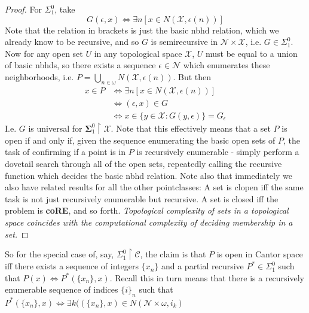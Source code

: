 \documentclass{article}
\theoremstyle{definition}
\theoremstyle{plain}
\begin{document}
\begin{proof}
	For $\Sigma_1^0$, take 
	\[ G(\epsilon,x) \iff \exists n[x \in N(\mathcal{X},\epsilon(n))] \]
	Note that the relation in brackets is just the basic nbhd relation, which we already know to be recursive, and so $G$ is semirecursive in $\mathcal{N} \times \mathcal{X}$, i.e. $G \in \Sigma^0_1$. Now for any open set $U$ in any topological space $\mathcal{X}$, $U$ must be equal to a union of basic nbhds, so there exists a sequence $\epsilon \in \mathcal{N}$ which enumerates these neighborhoods, i.e. $P = \bigcup_{n \in \omega} N(\mathcal{X},\epsilon(n))$. But then
	\begin{align}
		x \in P &\iff \exists n [x \in N(\mathcal{X},\epsilon(n))] \\
				&\iff (\epsilon,x) \in G \\
				&\iff x \in \{y \in \mathcal{X}: G(y,\epsilon)\} = G_{\epsilon}
	\end{align}
	I.e. $G$ is universal for $\bm{\Sigma}^0_1 \restriction \mathcal{X}$. Note that this effectively means that a set $P$ is open if and only if, given the sequence enumerating the basic open sets of $P$, the task of confirming if a point is in $P$ is recursively enumerable - simply perform a dovetail search through all of the open sets, repeatedly calling the recursive function which decides the basic nbhd relation. Note also that immediately we also have related results for all the other pointclasses: A  set is clopen iff the same task is not just recursively enumerable but recursive. A set is closed iff the problem is \textbf{coRE}, and so forth. \textit{Topological complexity of sets in a topological space coincides with the computational complexity of deciding membership in a set.}
\end{proof}
So for the special case of, say, $\Sigma^0_1 \restriction \mathcal{C}$, the claim is that $P$ is open in Cantor space iff there exists a sequence of integers $\{x_n\}$ and a partial recursive $P^* \in \Sigma^0_1$ such that $P(x) \iff P^*(\{x_n\},x)$. Recall this in turn means that there is a recursively enumerable sequence of indices $\{i\}_n$ such that $P^*(\{x_n\},x) \iff \exists k ((\{x_n\},x) \in N(\mathcal{N} \times \omega,i_k)$
\\
\end{document}
